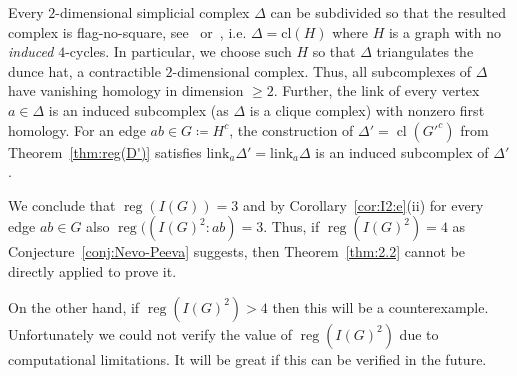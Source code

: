 \documentclass[ALCO,published]{cedram}
\numberwithin{equation}{section}
\newcommand \reg{\operatorname{reg}}
\newcommand \cl{\operatorname{cl}}
\begin{document}
  Every $2$-dimensional simplicial complex $\Delta$ can be subdivided so that the resulted complex is flag-no-square, see~\cite{Dr} or~\cite[Lem. 2.3]{PS}, i.e. $\Delta=\text{cl}(H)$ where $H$ is a graph with no \emph{induced} $4$-cycles. In particular,
we choose such $H$ so that $\Delta$ triangulates the dunce hat, a contractible $2$-dimensional complex.
Thus, all subcomplexes of $\Delta$ have vanishing homology in dimension $\ge 2$. Further, the link of every vertex $a\in \Delta$ is an induced subcomplex (as $\Delta$ is a clique complex) with nonzero first homology. For an edge $ab\in G\coloneqq H^c$, the construction of $\Delta'=\cl(G'^c)$ from  Theorem~\ref{thm:reg(D')} satisfies $\text{link}_a \Delta'=\text{link}_a \Delta$ is an induced subcomplex of $\Delta'$.

We conclude that $\reg(I(G))=3$ and by Corollary~\ref{cor:I2:e}(ii)
for every edge $ab\in G$ also $\reg((I(G)^2:ab)=3$.
Thus, if $\reg(I(G)^2)=4$ as Conjecture~\ref{conj:Nevo-Peeva} suggests, then Theorem~\ref{thm:2.2} cannot be directly applied to prove it.

On the other hand, if $\reg(I(G)^2)>4$ then this will be a counterexample. Unfortunately we could not verify the value of $\reg(I(G)^2)$ due to computational limitations. It will be great if this can be verified in the future.




%


 



\end{document}
